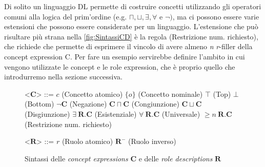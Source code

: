 Di solito un linguaggio DL permette di costruire concetti utilizzando gli operatori comuni alla logica del prim’ordine (e.g. $\sqcap, \sqcup, \exists, \forall \text{ e } \neg)$, ma ci possono essere varie estensioni che possono essere considerate per un linguaggio. L'estensione che può risultare più strana nella \autoref{fig:SintassiCD} è la regola (Restrizione num. richiesto), che richiede che permette di esprimere il vincolo di avere almeno \textit{n} \textit{r}-filler della concept expression C. Per fare un esempio servirebbe definire l'ambito in cui vengono utilizzate le concept e le role expression, che è proprio quello che introdurremo nella sezione successiva.\\
\begin{figure}[b!]
	\begin{center}	
		\begin{minipage}{0.6\textwidth}
			\setlength{\grammarindent}{3em} %
			\begin{grammar}
				\let\syntleft\relax
				\let\syntright\relax
				<$\mathbf{C}$> ::= $c$ \hfill (Concetto atomico)
				\alt $\{o\}$ \hfill (Concetto nominale)
				\alt $\top$ \hfill (Top)
				\alt $\bot$ \hfill (Bottom)
				\alt $\neg \mathbf{C} $ \hfill (Negazione)
				\alt $\mathbf{C} \sqcap \mathbf{C}$ \hfill (Congiunzione)
				\alt $\mathbf{C} \sqcup \mathbf{C}$ \hfill (Disgiunzione)
				\alt $\exists\ \mathbf{R}. \mathbf{C}$ \hfill (Esistenziale)
				\alt $\forall\ \mathbf{R}. \mathbf{C}$ \hfill (Universale)
				\alt $\ge n\ \mathbf{R} . \mathbf{C}$ \hfill (Restrizione num. richiesto)
				
				<$\mathbf{R}$> ::= $r$ \hfill (Ruolo atomico)
				\alt $\mathbf{R}^-$ \hfill (Ruolo inverso)
			\end{grammar}
		\end{minipage}
		\caption{Sintassi delle \textit{concept expressions} $\mathbf{C}$ e delle \textit{role descriptions} $\mathbf{R}$}
		\label{fig:SintassiCD}
	\end{center}
\end{figure}

